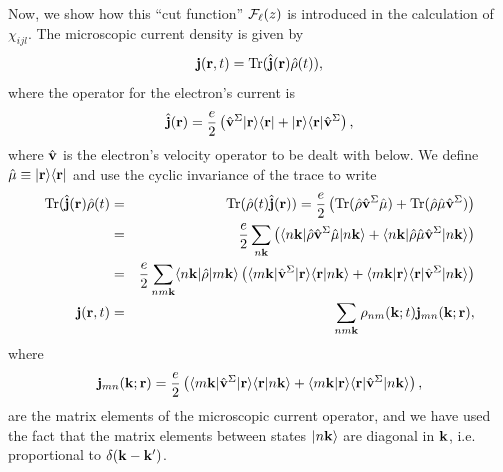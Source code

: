 \documentclass[floatfix,prb,aps,superscriptaddress,11pt,preprint]{revtex4}
\begin{document}
Now, we show how this ``cut function'' ${\mathbf{\cal F}}_\ell(z)$ is introduced in
the calculation of $\chi_{ijl}$.
The microscopic current density is given by
\begin{equation}\label{jmic}
\mathbf{j}(\mathbf{r},t)=\mathrm{Tr}(\hat{\mathbf{j}}(\mathbf{r})\hat\rho(t)),
\end{equation}
where the operator for the electron's current is
\begin{equation}\label{hatjmic}
\hat{\mathbf{j}}(\mathbf{r})=\frac{e}{2}\left(\hat{\mathbf{v}}^\Sigma| \mathbf{r} \rangle\langle \mathbf{r} |
+| \mathbf{r} \rangle\langle \mathbf{r} |\hat{\mathbf{v}}^\Sigma\right), 
\end{equation}
where $\hat{\mathbf{v}}$ is the electron's velocity operator to be dealt
with below. We define
$\hat\mu\equiv| \mathbf{r} \rangle\langle \mathbf{r} |$ and use the cyclic invariance of
the trace to write
\begin{eqnarray}\label{jmic2}
\mathrm{Tr}(\hat{\mathbf{j}}(\mathbf{r})\hat\rho(t)&=&\mathrm{Tr}(\hat\rho(t)\hat{\mathbf{j}}(\mathbf{r}))=
\frac{e}{2}
\left(
\mathrm{Tr}(\hat\rho\hat{\mathbf{v}}^\Sigma\hat\mu)
+
\mathrm{Tr}(\hat\rho\hat\mu\hat{\mathbf{v}}^\Sigma)
\right)
\nonumber\\
&=&
\frac{e}{2}
\sum_{n\mathbf{k}}
\left(
\langle n\mathbf{k} |\hat\rho\hat{\mathbf{v}}^\Sigma\hat\mu| n\mathbf{k} \rangle
+
\langle n\mathbf{k} |\hat\rho\hat\mu\hat{\mathbf{v}}^\Sigma| n\mathbf{k} \rangle
\right)
\nonumber\\
&=&
\frac{e}{2}
\sum_{nm\mathbf{k}}
\langle n\mathbf{k} |\hat\rho| m\mathbf{k} \rangle
\left(
\langle m\mathbf{k} |\hat{\mathbf{v}}^\Sigma| \mathbf{r} \rangle\langle {\mathbf{r}} | {n\mathbf{k}} \rangle
+
\langle {m\mathbf{k}} | {\mathbf{r}} \rangle\langle \mathbf{r} |\hat{\mathbf{v}}^\Sigma| n\mathbf{k} \rangle
\right)
\nonumber\\
\mathbf{j}(\mathbf{r},t)&=&
\sum_{nm\mathbf{k}}
\rho_{nm}(\mathbf{k};t)\mathbf{j}_{mn}(\mathbf{k};\mathbf{r}),
\end{eqnarray}
where
\begin{equation}\label{jmic3}
\mathbf{j}_{mn}(\mathbf{k};\mathbf{r})=
\frac{e}{2}
\left(
\langle m\mathbf{k} |\hat{\mathbf{v}}^\Sigma| \mathbf{r} \rangle\langle {\mathbf{r}} | {n\mathbf{k}} \rangle
+
\langle {m\mathbf{k}} | {\mathbf{r}} \rangle\langle \mathbf{r} |\hat{\mathbf{v}}^\Sigma| n\mathbf{k} \rangle
\right),
\end{equation}
are the matrix elements of the microscopic current operator,
and we have used the fact that the matrix elements between states $| n\mathbf{k} \rangle$
are diagonal in $\mathbf{k}$, i.e. proportional to $\delta(\mathbf{k}-\mathbf{k}')$.
\end{document}

